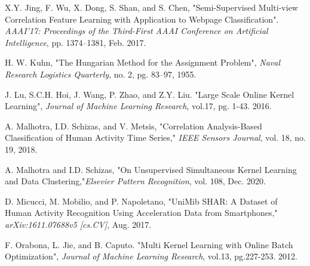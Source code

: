 \documentclass[10pt,final]{IEEEtran}
\begin{document}
\begin{thebibliography}{1}

X.Y. Jing, F. Wu, X. Dong, S. Shan, and S. Chen, "Semi-Supervised Multi-view Correlation Feature Learning with Application to Webpage Classification". \emph{AAAI'17: Proceedings of the Third-First AAAI Conference on Artificial Intelligence}, pp. 1374--1381, Feb. 2017.


H. W. Kuhn, "The Hungarian Method for the Assignment Problem", \emph{Naval Research Logistics Quarterly}, no. 2, pg. 83--97, 1955.

J. Lu, S.C.H. Hoi, J. Wang, P. Zhao, and Z.Y. Liu. "Large Scale Online Kernel Learning", \emph{Journal of Machine Learning Research}, vol.17, pg. 1-43. 2016.


A. Malhotra, I.D. Schizas, and V. Metsis, "Correlation Analysis-Based Classification of Human Activity Time Series," \emph{IEEE Sensors Journal}, vol. 18, no. 19,  2018.


A. Malhotra and I.D. Schizas, "On Unsupervised Simultaneous Kernel Learning and Data Clustering,"{{\emph{Elsevier Pattern Recognition}, vol. 108, Dec. 2020.}}

D. Micucci, M. Mobilio, and P. Napoletano, "UniMib SHAR: A Dataset of Human Activity Recognition Using Acceleration Data from Smartphones," \emph{arXiv:1611.07688v5 [cs.CV]}, Aug. 2017.

F. Orabona, L. Jie, and B. Caputo. "Multi Kernel Learning with Online Batch Optimization", \emph{Journal of Machine Learning Research}, vol.13, pg.227-253. 2012.


\end{thebibliography}
\end{document}
